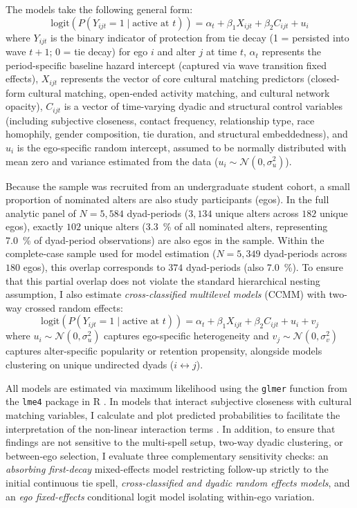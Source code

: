 \documentclass[12pt,letterpaper]{article}
\def\percent{\%}%
\begin{document}
The models take the following general form:
\begin{equation}
\text{logit}(P(Y_{ijt} = 1 \mid \text{active at } t)) = \alpha_t + \beta_1 X_{ijt} + \beta_2 C_{ijt} + u_i
\end{equation}
where $Y_{ijt}$ is the binary indicator of protection from tie decay (1 = persisted into wave $t+1$; 0 = tie decay) for ego $i$ and alter $j$ at time $t$, $\alpha_t$ represents the period-specific baseline hazard intercept (captured via wave transition fixed effects), $X_{ijt}$ represents the vector of core cultural matching predictors (closed-form cultural matching, open-ended activity matching, and cultural network opacity), $C_{ijt}$ is a vector of time-varying dyadic and structural control variables (including subjective closeness, contact frequency, relationship type, race homophily, gender composition, tie duration, and structural embeddedness), and $u_i$ is the ego-specific random intercept, assumed to be normally distributed with mean zero and variance estimated from the data ($u_i \sim \mathcal{N}(0, \sigma_u^2)$).

Because the sample was recruited from an undergraduate student cohort, a small proportion of nominated alters are also study participants (egos). In the full analytic panel of $N = 5,584$ dyad-periods ($3,134$ unique alters across $182$ unique egos), exactly $102$ unique alters (\SI{3.3}{\percent} of all nominated alters, representing \SI{7.0}{\percent} of dyad-period observations) are also egos in the sample. Within the complete-case sample used for model estimation ($N = 5,349$ dyad-periods across $180$ egos), this overlap corresponds to $374$ dyad-periods (also \SI{7.0}{\percent}). To ensure that this partial overlap does not violate the standard hierarchical nesting assumption, I also estimate \textit{cross-classified multilevel models} (CCMM) with two-way crossed random effects:
\begin{equation}
\text{logit}(P(Y_{ijt} = 1 \mid \text{active at } t)) = \alpha_t + \beta_1 X_{ijt} + \beta_2 C_{ijt} + u_i + v_j
\end{equation}
where $u_i \sim \mathcal{N}(0, \sigma_u^2)$ captures ego-specific heterogeneity and $v_j \sim \mathcal{N}(0, \sigma_v^2)$ captures alter-specific popularity or retention propensity, alongside models clustering on unique undirected dyads ($i \leftrightarrow j$).

All models are estimated via maximum likelihood using the \texttt{glmer} function from the \texttt{lme4} package \citep{bates2015} in \textsf{R} \citep{Rmanual}. In models that interact subjective closeness with cultural matching variables, I calculate and plot predicted probabilities to facilitate the interpretation of the non-linear interaction terms \citep{mize2019best}. In addition, to ensure that findings are not sensitive to the multi-spell setup, two-way dyadic clustering, or between-ego selection, I evaluate three complementary sensitivity checks: an \textit{absorbing first-decay} mixed-effects model restricting follow-up strictly to the initial continuous tie spell, \textit{cross-classified and dyadic random effects models}, and an \textit{ego fixed-effects} conditional logit model isolating within-ego variation.
\end{document}
